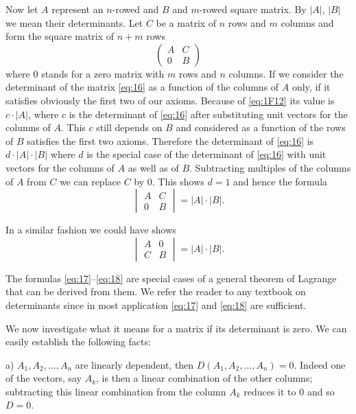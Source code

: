 \documentclass[10pt,leqno]{article}
\theoremstyle{definition}
\begin{document}
Now let $A$ represent an $n$-rowed and $B$ and $m$-rowed square matrix.
By $|A|$, $|B|$ we mean their determinants.
Let $C$ be a matrix of $n$ rows and $m$ columns and form the square matrix of $n+m$ rows
\begin{equation}
\label{eq:16}
\begin{pmatrix}
A & C
\\
0 & B
\end{pmatrix}
\end{equation}
where $0$ stands for a zero matrix with $m$ rows and $n$ columns.
If we consider the determinant of the matrix \eqref{eq:16} as a function of the columns of $A$ only, if it satisfies obviously the first two of our axioms.
Because of \eqref{eq:1F12} its value is $c \cdot |A|$, where $c$ is the determinant of \eqref{eq:16} after substituting unit vectors for the columns of $A$.
This $c$ still depends on $B$ and considered as a function of the rows of $B$ satisfies the first two axioms.
Therefore the determinant of \eqref{eq:16} is $d \cdot |A| \cdot |B|$ where $d$ is the special case of the determinant of \eqref{eq:16} with unit vectors for the columns of $A$ as well as of $B$.
Subtracting multiples of the columns of $A$ from $C$ we can replace $C$ by $0$.
This shows $d = 1$ and hence the formula
\begin{equation}
\label{eq:17}
\begin{vmatrix}
A & C
\\
0 & B
\end{vmatrix}
= |A| \cdot |B|.
\end{equation}

In a similar fashion we could have shows
\begin{equation}
\label{eq:18}
\begin{vmatrix}
A & 0
\\
C & B
\end{vmatrix}
= |A| \cdot |B|.
\end{equation}

The formulas \eqref{eq:17}--\eqref{eq:18} are special cases of a general theorem of Lagrange that can be derived from them.
We refer the reader to any textbook on determinants since in most application \eqref{eq:17} and \eqref{eq:18} are sufficient.

We now investigate what it means for a matrix if its determinant is zero.
We can easily establish the following facts:

a) $A_1, A_2, \ldots, A_n$ are linearly dependent, then $D(A_1, A_2, \ldots, A_n) = 0$.
Indeed one of the vectors, say $A_k$, is then a linear combination of the other columns; subtracting this linear combination from the column $A_k$ reduces it to $0$ and so $D = 0$.
\end{document}
